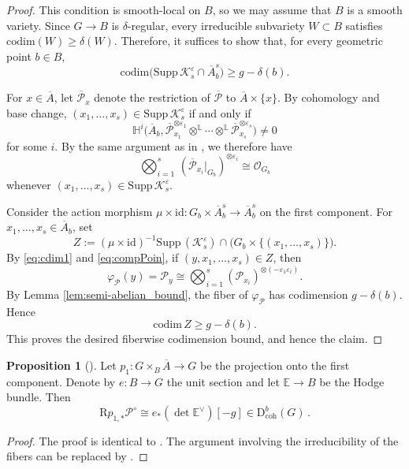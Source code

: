 \documentclass[11pt]{article}
\def\CO{\mathcal{O}}
\def\P{\mathcal{P}}
\def\id{\mathrm{id}}
\def\EE{\mathbb{E}}
\def\LL{\mathbb{L}}
\def\codim{\mathrm{codim}}
\def\dbcoh{\mathrm{D}^b_{\mathrm{coh}}}
\def\Pbar{\overline{\mathcal{P}}}
\newcommand{\barA}{\overline{A}}
\newcommand{\K}{\mathcal{K}}
\newcommand{\supp}{\mathrm{Supp}\,}
\theoremstyle{definition}
\newtheorem{proposition}[definition]{Proposition}
\begin{document}
\begin{proof}
    This condition is smooth-local on $B$, so we may assume that $B$ is a smooth variety. Since $G \to B$ is $\delta$-regular, every irreducible subvariety $W \subset B$ satisfies $\codim(W) \geq \delta(W)$. Therefore, it suffices to show that, for every geometric point $b \in B$,
    \[
    \codim\bigl(\supp \K_s^{\varepsilon} \cap \barA_b^s\bigr) \geq g - \delta(b).
    \]

    For $x \in \barA$, let $\Pbar_x$ denote the restriction of $\Pbar$ to
    $\barA \times \{x\}$. By cohomology and base change,
    $(x_1,\ldots,x_s) \in \supp \K^{\varepsilon}_s$ if and only if
    \[
    \mathbb H^i\bigl(
        \barA_b,
        \Pbar^{\otimes\varepsilon_1}_{x_1} \otimes^{\LL} \cdots \otimes^{\LL} \Pbar^{\otimes \varepsilon_s}_{x_s}
    \bigr) \neq 0
    \]
    for some $i$. By the same argument as in
    \cite[Proposition 7.2]{Arinkin2}, we therefore have
    \begin{equation}\label{eq:cdim1}
        \bigotimes_{i=1}^s \, (\Pbar_{x_i}|_{G_b})^{\otimes \varepsilon_i} \cong \CO_{G_b}
    \end{equation}
	whenever $(x_1,\dots,x_s)\in \supp \K^{\varepsilon}_s$.

    Consider the action morphism $\mu \times \id : G_b \times \barA_b^s \to \barA_b^s$ on the first component. For $x_1,\ldots,x_s \in \barA_b$, set
    \[
    Z :=
    (\mu \times \id)^{-1}\supp(\K_s^\varepsilon)
    \cap
    \bigl(G_b \times \{(x_1,\ldots,x_s)\}\bigr).
    \]
    By \eqref{eq:cdim1} and \eqref{eq:compPoin}, if
    $(y,x_1,\ldots,x_s) \in Z$, then
    \[
    \varphi_{\mathcal P}(y)
    =
    \P_y
    \cong
    \bigotimes_{i=1}^s (\P_{x_i})^{\otimes (-\varepsilon_1\varepsilon_i)}.
    \]
    By Lemma \ref{lem:semi-abelian_bound}, the fiber of
    $\varphi_{\mathcal P}$ has codimension $g-\delta(b)$. Hence
    \[
    \codim \, Z \geq g-\delta(b).
    \]
    This proves the desired fiberwise codimension bound, and hence the claim.
\end{proof}

\begin{proposition}[\cite{Arinkin1}]\label{pro:partial}
    Let $p_1 : G \times_B \barA \to G$ be the projection onto the first component. Denote by $e : B \to G$ the unit section and let $\EE \to B$ be the Hodge bundle. Then
    \[
    \mathrm{R}p_{1,*} \P^\circ \cong e_* (\det \EE^{\vee}) [-g] \in \dbcoh(G)\,.
    \]
\end{proposition}

\begin{proof}
    The proof is identical to \cite{Arinkin1}. The argument involving the irreducibility of the fibers can be replaced by \cite[Lemma 6.5]{MRV1}.
\end{proof}
\end{document}
